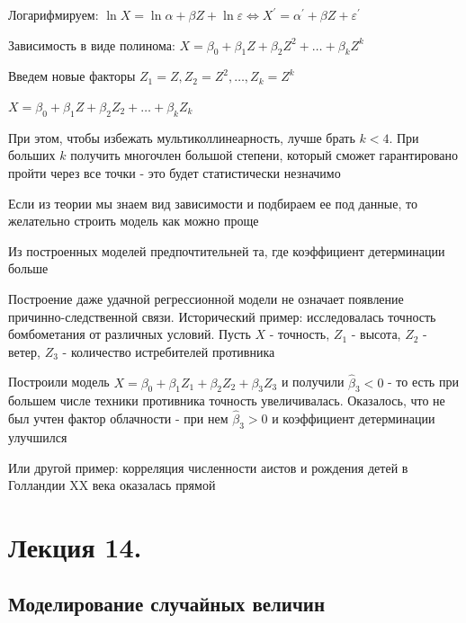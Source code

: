 \documentclass[12pt]{article}
\begin{document}
Логарифмируем: $\ln X = \ln \alpha + \beta Z + \ln \varepsilon \Longleftrightarrow X^\prime = \alpha^\prime + \beta Z + \varepsilon^\prime$

 Зависимость в виде полинома: $X = \beta_0 + \beta_1 Z + \beta_2 Z^2 + \dots + \beta_k Z^k$

Введем новые факторы $Z_1 = Z, Z_2 = Z^2, \dots, Z_k = Z^k$

$X = \beta_0 + \beta_1 Z + \beta_2 Z_2 + \dots + \beta_k Z_k$

При этом, чтобы избежать мультиколлинеарность, лучше брать $k < 4$. При больших $k$ получить многочлен большой степени, который сможет гарантировано пройти через все точки - это будет статистически незначимо


\Nota Если из теории мы знаем вид зависимости и подбираем ее под данные, то желательно строить модель как можно проще

\Notas Из построенных моделей предпочтительней та, где коэффициент детерминации больше

\mediumvspace

Построение даже удачной регрессионной модели не означает появление причинно-следственной связи. Исторический пример: исследовалась точность бомбометания от различных условий. Пусть $X$ - точность, $Z_1$ - высота, $Z_2$ - ветер, $Z_3$ - количество истребителей противника

Построили модель $X = \beta_0 + \beta_1 Z_1 + \beta_2 Z_2 + \beta_3 Z_3$ и получили $\hat \beta_3 < 0$ - то есть при большем числе техники противника точность увеличивалась. Оказалось, что не был учтен фактор облачности - при нем $\hat \beta_3 > 0$ и коэффициент детерминации улучшился

Или другой пример: корреляция численности аистов и рождения детей в Голландии XX века оказалась прямой













\section{Лекция 14.}

\subsection{Моделирование случайных величин}
\end{document}
